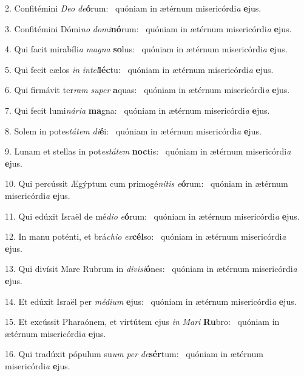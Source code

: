 2. Confitémini \textit{De}\textit{o} \textit{de}\textbf{ó}rum: \ast\  quóniam in ætérnum misericórdi\textit{a} \textbf{e}jus.\

3. Confitémini Dómi\textit{no} \textit{do}\textit{mi}\textbf{nó}rum: \ast\  quóniam in ætérnum misericórdi\textit{a} \textbf{e}jus.\

4. Qui facit mirabíli\textit{a} \textit{ma}\textit{gna} \textbf{so}lus: \ast\  quóniam in ætérnum misericórdi\textit{a} \textbf{e}jus.\

5. Qui fecit cælos \textit{in} \textit{in}\textit{tel}\textbf{léc}tu: \ast\  quóniam in ætérnum misericórdi\textit{a} \textbf{e}jus.\

6. Qui firmávit ter\textit{ram} \textit{su}\textit{per} \textbf{a}quas: \ast\  quóniam in ætérnum misericórdi\textit{a} \textbf{e}jus.\

7. Qui fecit lumi\textit{ná}\textit{ri}\textit{a} \textbf{ma}gna: \ast\  quóniam in ætérnum misericórdi\textit{a} \textbf{e}jus.\

8. Solem in potes\textit{tá}\textit{tem} \textit{di}\textbf{é}i: \ast\  quóniam in ætérnum misericórdi\textit{a} \textbf{e}jus.\

9. Lunam et stellas in pot\textit{es}\textit{tá}\textit{tem} \textbf{noc}tis: \ast\  quóniam in ætérnum misericórdi\textit{a} \textbf{e}jus.\

10. Qui percússit Ægýptum cum primogé\textit{ni}\textit{tis} \textit{e}\textbf{ó}rum: \ast\  quóniam in ætérnum misericórdi\textit{a} \textbf{e}jus.\

11. Qui edúxit Israël de mé\textit{di}\textit{o} \textit{e}\textbf{ó}rum: \ast\  quóniam in ætérnum misericórdi\textit{a} \textbf{e}jus.\

12. In manu poténti, et brá\textit{chi}\textit{o} \textit{ex}\textbf{cél}so: \ast\  quóniam in ætérnum misericórdi\textit{a} \textbf{e}jus.\

13. Qui divísit Mare Rubrum in \textit{di}\textit{vi}\textit{si}\textbf{ó}nes: \ast\  quóniam in ætérnum misericórdi\textit{a} \textbf{e}jus.\

14. Et edúxit Israël per \textit{mé}\textit{di}\textit{um} \textbf{e}jus: \ast\  quóniam in ætérnum misericórdi\textit{a} \textbf{e}jus.\

15. Et excússit Pharaónem, et virtútem ejus \textit{in} \textit{Ma}\textit{ri} \textbf{Ru}bro: \ast\  quóniam in ætérnum misericórdi\textit{a} \textbf{e}jus.\

16. Qui tradúxit pópulum su\textit{um} \textit{per} \textit{de}\textbf{sér}tum: \ast\  quóniam in ætérnum misericórdi\textit{a} \textbf{e}jus.\

